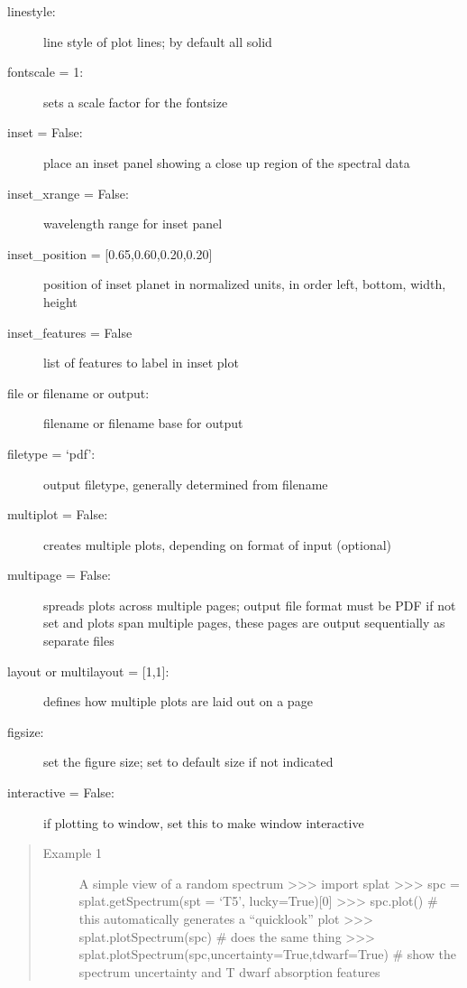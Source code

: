 \documentclass[letterpaper,10pt,english]{sphinxmanual}
\begin{document}
\begin{fulllineitems}
\begin{description}
\item[{linestyle:}] \leavevmode
line style of plot lines; by default all solid

\item[{fontscale = 1:}] \leavevmode
sets a scale factor for the fontsize

\item[{inset = False:}] \leavevmode
place an inset panel showing a close up region of the spectral data

\item[{inset\_xrange = False:}] \leavevmode
wavelength range for inset panel

\item[{inset\_position = {[}0.65,0.60,0.20,0.20{]}}] \leavevmode
position of inset planet in normalized units, in order left, bottom, width, height

\item[{inset\_features = False}] \leavevmode
list of features to label in inset plot

\item[{file or filename or output:}] \leavevmode
filename or filename base for output

\item[{filetype = `pdf':}] \leavevmode
output filetype, generally determined from filename

\item[{multiplot = False:}] \leavevmode
creates multiple plots, depending on format of input (optional)

\item[{multipage = False:}] \leavevmode
spreads plots across multiple pages; output file format must be PDF
if not set and plots span multiple pages, these pages are output sequentially as separate files

\item[{layout or multilayout = {[}1,1{]}:}] \leavevmode
defines how multiple plots are laid out on a page

\item[{figsize:}] \leavevmode
set the figure size; set to default size if not indicated

\item[{interactive = False:}] \leavevmode
if plotting to window, set this to make window interactive

\end{description}
\begin{quote}\begin{description}
\item[{Example 1}] \leavevmode
A simple view of a random spectrum
\textgreater{}\textgreater{}\textgreater{} import splat
\textgreater{}\textgreater{}\textgreater{} spc = splat.getSpectrum(spt = `T5', lucky=True){[}0{]}
\textgreater{}\textgreater{}\textgreater{} spc.plot()                       \# this automatically generates a ``quicklook'' plot
\textgreater{}\textgreater{}\textgreater{} splat.plotSpectrum(spc)          \# does the same thing
\textgreater{}\textgreater{}\textgreater{} splat.plotSpectrum(spc,uncertainty=True,tdwarf=True)     \# show the spectrum uncertainty and T dwarf absorption features


\end{description}
\end{quote}
\end{fulllineitems}
\end{document}
